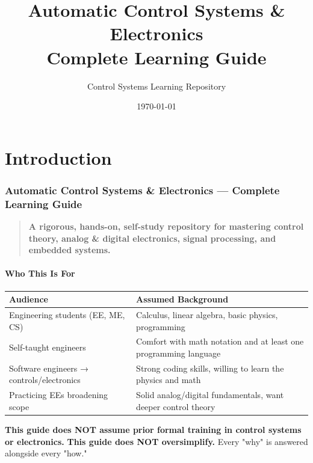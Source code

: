 \documentclass[11pt,a4paper]{book}
\title{Automatic Control Systems \& Electronics\\
\large Complete Learning Guide}
\author{Control Systems Learning Repository}
\date{\today}
\begin{document}
\maketitle

\tableofcontents
\newpage

\chapter*{Introduction}
\subsection{Automatic Control Systems & Electronics — Complete Learning Guide}

\begin{quote}
\textbf{A rigorous, hands-on, self-study repository for mastering control theory, analog & digital electronics, signal processing, and embedded systems.}
\end{quote}

\medskip\noindent\hrulefill\medskip

\subsubsection{Who This Is For}

\begin{center}
\begin{tabular}{|l|l|}
\hline
Audience & Assumed Background \\
\hline
Engineering students (EE, ME, CS) & Calculus, linear algebra, basic physics, programming \\
Self-taught engineers & Comfort with math notation and at least one programming language \\
Software engineers → controls/electronics & Strong coding skills, willing to learn the physics and math \\
Practicing EEs broadening scope & Solid analog/digital fundamentals, want deeper control theory \\
\hline
\end{tabular}
\end{center}

\textbf{This guide does NOT assume prior formal training in control systems or electronics.}  
\textbf{This guide does NOT oversimplify.} Every "why" is answered alongside every "how."

\medskip\noindent\hrulefill\medskip
\end{document}
